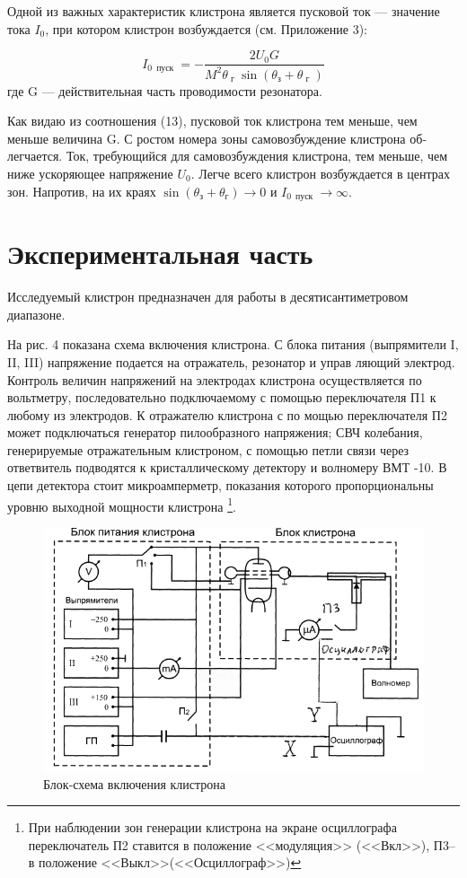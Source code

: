 Одной из важных характеристик клистрона является пусковой ток — зна­чение тока $I_0$, при котором клистрон возбуждается (см. Приложение 3):

\begin{equation}
	I _ { 0 \, \text { пуск } } = - \frac { 2 U _ { 0 } G } { M ^ { 2 } 
	\theta _ { \text{ г } } \sin \left( \theta _ { \text{з} } + \theta _ { \text{ г } } \right) }
\end{equation} где G — действительная часть проводимости резонатора.

Как видаю из соотношения (13), пусковой ток клистрона тем меньше, чем
меньше величина G. С ростом номера зоны самовозбуждение клистрона об­легчается. Ток, требующийся для самовозбуждения клистрона, тем меньше,
чем ниже ускоряющее напряжение $U_0$. Легче всего клистрон возбуждается
в центрах зон. Напротив, на их краях 
$\sin \left( \theta _ { \text{з} } + \theta _ { \text{г} } \right) \rightarrow 0$ и 
$I _ { 0\, \text { пуск } } \rightarrow \infty$.
\section{Экспериментальная часть}

Исследуемый клистрон предназначен для работы в десятисантиметровом
диапазоне.

На рис. 4 показана схема включения клистрона. С блока питания (выпря­мители I, II, III) напряжение подается на отражатель, резонатор и управ­
ляющий электрод. Контроль величин напряжений на электродах клистрона
осуществляется по вольтметру, последовательно подключаемому с помощью
переключателя П1 к любому из электродов. К отражателю клистрона с по­
мощью переключателя П2 может подключаться генератор пилообразного
напряжения; СВЧ колебания, генерируемые отражательным клистроном, с
помощью петли связи через ответвитель подводятся к кристаллическому
детектору и волномеру ВМТ -10. В цепи детектора стоит микроамперметр,
показания которого пропорциональны уровню выходной мощности клистро­на
\footnote{При наблюдении зон генерации клистрона на экране осциллографа переключатель П2 ставится  в положение <<модуляция>> (<<Вкл>>), П3--в положение <<Выкл>>(<<Осциллограф>>)}.

\begin{figure}[h!]
	\centering
	\includegraphics[width=\textwidth]{fig/fig4}
	\caption{ Блок-схема включения клистрона}
	\label{fig:4}
\end{figure}

